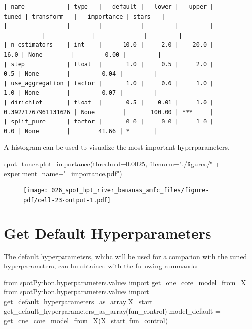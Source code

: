 \documentclass[
  letterpaper,
  DIV=11,
  numbers=noendperiod]{scrreprt}
\newenvironment{Shaded}{\begin{snugshade}}{\end{snugshade}}
\newcommand{\FloatTok}[1]{\textcolor[rgb]{0.68,0.00,0.00}{#1}}
\newcommand{\ImportTok}[1]{\textcolor[rgb]{0.00,0.46,0.62}{#1}}
\newcommand{\NormalTok}[1]{\textcolor[rgb]{0.00,0.23,0.31}{#1}}
\newcommand{\OperatorTok}[1]{\textcolor[rgb]{0.37,0.37,0.37}{#1}}
\newcommand{\StringTok}[1]{\textcolor[rgb]{0.13,0.47,0.30}{#1}}
\begin{document}
\begin{verbatim}
| name            | type   |   default |   lower |   upper |               tuned | transform   |   importance | stars   |
|-----------------|--------|-----------|---------|---------|---------------------|-------------|--------------|---------|
| n_estimators    | int    |      10.0 |     2.0 |    20.0 |                16.0 | None        |         0.00 |         |
| step            | float  |       1.0 |     0.5 |     2.0 |                 0.5 | None        |         0.04 |         |
| use_aggregation | factor |       1.0 |     0.0 |     1.0 |                 1.0 | None        |         0.07 |         |
| dirichlet       | float  |       0.5 |    0.01 |     1.0 | 0.39271767961131626 | None        |       100.00 | ***     |
| split_pure      | factor |       0.0 |     0.0 |     1.0 |                 0.0 | None        |        41.66 | *       |
\end{verbatim}

A histogram can be used to visualize the most important hyperparameters.

\begin{Shaded}
\begin{Highlighting}[]
\NormalTok{spot\_tuner.plot\_importance(threshold}\OperatorTok{=}\FloatTok{0.0025}\NormalTok{, filename}\OperatorTok{=}\StringTok{"./figures/"} \OperatorTok{+}\NormalTok{ experiment\_name}\OperatorTok{+}\StringTok{"\_importance.pdf"}\NormalTok{)}
\end{Highlighting}
\end{Shaded}

\begin{figure}[H]

{\centering \texttt{[image: 026\_spot\_hpt\_river\_bananas\_amfc\_files/figure-pdf/cell-23-output-1.pdf]}

}

\end{figure}

\hypertarget{get-default-hyperparameters-7}{%
\section{Get Default
Hyperparameters}\label{get-default-hyperparameters-7}}

The default hyperparameters, whihc will be used for a comparion with the
tuned hyperparameters, can be obtained with the following commands:

\begin{Shaded}
\begin{Highlighting}[]
\ImportTok{from}\NormalTok{ spotPython.hyperparameters.values }\ImportTok{import}\NormalTok{ get\_one\_core\_model\_from\_X}
\ImportTok{from}\NormalTok{ spotPython.hyperparameters.values }\ImportTok{import}\NormalTok{ get\_default\_hyperparameters\_as\_array}
\NormalTok{X\_start }\OperatorTok{=}\NormalTok{ get\_default\_hyperparameters\_as\_array(fun\_control)}
\NormalTok{model\_default }\OperatorTok{=}\NormalTok{ get\_one\_core\_model\_from\_X(X\_start, fun\_control)}
\end{Highlighting}
\end{Shaded}
\end{document}

